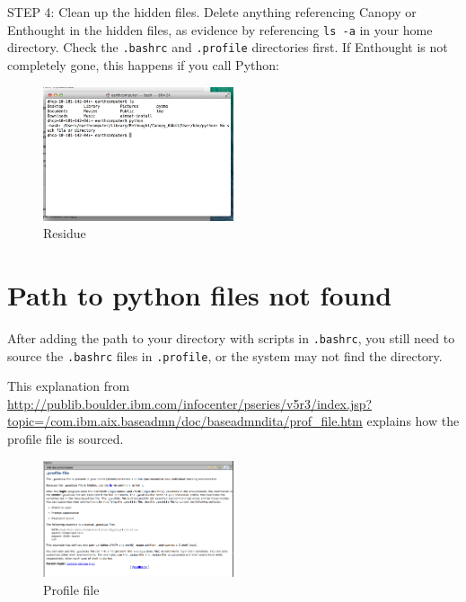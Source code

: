 \documentclass[letterpaper,10pt]{article}
\begin{document}
STEP 4: Clean up the hidden files. Delete anything referencing Canopy or Enthought in the hidden files, as evidence by referencing \verb"ls -a" in your home directory. Check the \verb".bashrc" and \verb".profile" directories first. If Enthought is not completely gone, this happens if you call Python:

\begin{figure}[h!]
  \centering
  \includegraphics[width=0.5\textwidth]{images/residue}
  \caption{Residue}
  \label{fig:residue}
\end{figure}




\section{Path to python files not found}


After adding the path to your directory with scripts in \verb".bashrc", you still need to source the \verb".bashrc" files in \verb".profile", or the system may not find the directory. 

This explanation from \url{http://publib.boulder.ibm.com/infocenter/pseries/v5r3/index.jsp?topic=/com.ibm.aix.baseadmn/doc/baseadmndita/prof_file.htm} explains how the profile file is sourced. 

\begin{figure}[h!]
  \centering
  \includegraphics[width=0.5\textwidth]{images/profile_file}
  \caption{Profile file}
  \label{fig:profile_file}
\end{figure}
\end{document}
